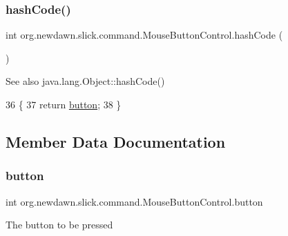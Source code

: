 \subsubsection{\texorpdfstring{hash\+Code()}{hashCode()}}
{\footnotesize\ttfamily int org.\+newdawn.\+slick.\+command.\+Mouse\+Button\+Control.\+hash\+Code (\begin{DoxyParamCaption}{ }\end{DoxyParamCaption})\hspace{0.3cm}{\ttfamily [inline]}}

\begin{DoxySeeAlso}{See also}
java.\+lang.\+Object\+::hash\+Code() 
\end{DoxySeeAlso}

\begin{DoxyCode}
36                           \{
37         \textcolor{keywordflow}{return} \mbox{\hyperlink{classorg_1_1newdawn_1_1slick_1_1command_1_1_mouse_button_control_acb6114b65f6e0fd07d4d820d6bd2c04c}{button}};
38     \}
\end{DoxyCode}


\subsection{Member Data Documentation}
\mbox{\label{classorg_1_1newdawn_1_1slick_1_1command_1_1_mouse_button_control_acb6114b65f6e0fd07d4d820d6bd2c04c}} 
\subsubsection{\texorpdfstring{button}{button}}
{\footnotesize\ttfamily int org.\+newdawn.\+slick.\+command.\+Mouse\+Button\+Control.\+button\hspace{0.3cm}{\ttfamily [private]}}

The button to be pressed 